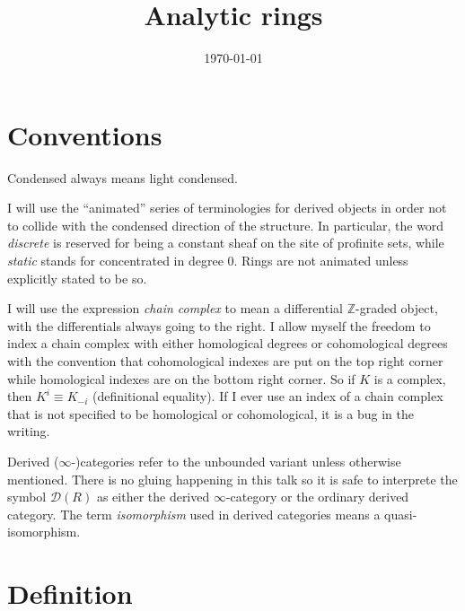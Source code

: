 \documentclass{article}
\title{Analytic rings}
\author{}
\date{\today}
\theoremstyle{plain}
\theoremstyle{definition}
\theoremstyle{remark}
\newcommand{\quot}[1]{“#1”}
\newcommand{\D}{\mathcal{D}}
\begin{document}
\maketitle
\tableofcontents

\section*{Conventions}

Condensed always means light condensed.

I will use the \quot{animated} series of terminologies for derived objects in order not to collide with the condensed direction of the structure.
In particular,
the word \emph{discrete} is reserved for being a constant sheaf on the site of profinite sets, while
\emph{static} stands for concentrated in degree $ 0 $.
Rings are not animated unless explicitly stated to be so.

I will use the expression \emph{chain complex} to mean a differential $ \mathbb{Z} $-graded object, with
the differentials always going to the right.
I allow myself the freedom to index a chain complex with either homological degrees or cohomological degrees with the convention that
cohomological indexes are put on the top right corner while homological indexes are on the bottom right corner.
So if $ K $ is a complex, then $ K ^{i} \equiv K _{-i} $ (definitional equality).
If I ever use an index of a chain complex that is not specified to be homological or cohomological, it is a bug in the writing.

Derived ($ \infty $-)categories refer to the unbounded variant unless otherwise mentioned.
There is no gluing happening in this talk so it is safe to interprete the symbol $ \D(R) $ as either the derived $ \infty $-category
or the ordinary derived category.
The term \emph{isomorphism} used in derived categories means a quasi-isomorphism.

\pagebreak

\section{Definition}
\end{document}
